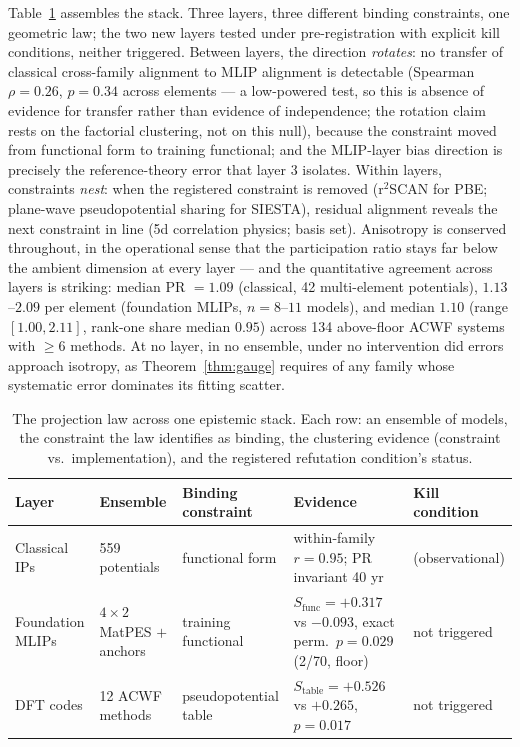 \documentclass[11pt]{article}
\begin{document}
Table~\ref{tab:layers} assembles the stack. Three layers, three different
binding constraints, one geometric law; the two new layers tested under
pre-registration with explicit kill conditions, neither triggered. Between
layers, the direction \emph{rotates}: no transfer of classical cross-family
alignment to MLIP alignment is detectable (Spearman $\rho = 0.26$, $p = 0.34$
across elements --- a low-powered test, so this is absence of evidence for
transfer rather than evidence of independence; the rotation claim rests on
the factorial clustering, not on this null), because the constraint moved
from functional form to training functional; and the MLIP-layer bias
direction is precisely the
reference-theory error that layer 3 isolates. Within layers, constraints
\emph{nest}: when the registered constraint is removed (r$^2$SCAN for PBE;
plane-wave pseudopotential sharing for SIESTA), residual alignment reveals the
next constraint in line (5d correlation physics; basis set). Anisotropy is
conserved throughout, in the operational sense that the participation ratio
stays far below the ambient dimension at every layer --- and the quantitative
agreement across layers is striking: median PR $= 1.09$ (classical, 42
multi-element potentials), $1.13$--$2.09$ per element (foundation MLIPs,
$n = 8$--$11$ models), and median $1.10$ (range $[1.00, 2.11]$, rank-one
share median $0.95$) across 134 above-floor ACWF systems with $\geq 6$
methods. At no layer, in no ensemble, under no intervention did errors
approach isotropy, as Theorem~\ref{thm:gauge} requires of any family whose
systematic error dominates its fitting scatter.

\begin{table}[t]
\centering
\caption{The projection law across one epistemic stack. Each row: an ensemble
of models, the constraint the law identifies as binding, the clustering
evidence (constraint vs.\ implementation), and the registered refutation
condition's status.}
\label{tab:layers}
\small
\begin{tabularx}{\textwidth}{@{}l l l X l@{}}
\toprule
Layer & Ensemble & Binding constraint & Evidence & Kill condition \\
\midrule
Classical IPs & 559 potentials & functional form & within-family $r{=}0.95$; PR invariant 40 yr & (observational) \\
Foundation MLIPs & $4{\times}2$ MatPES $+$ anchors & training functional & $S_{\mathrm{func}}{=}{+}0.317$ vs ${-}0.093$, exact perm.\ $p{=}0.029$ (2/70, floor) & not triggered \\
DFT codes & 12 ACWF methods & pseudopotential table & $S_{\mathrm{table}}{=}{+}0.526$ vs ${+}0.265$, $p{=}0.017$ & not triggered \\
\bottomrule
\end{tabularx}
\end{table}
\end{document}
